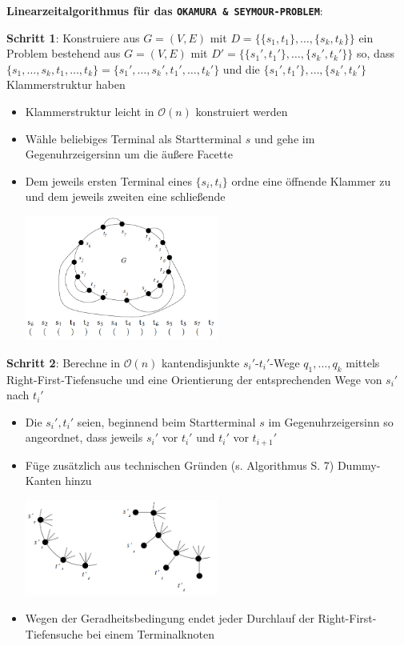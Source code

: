\textbf{Linearzeitalgorithmus für das \texttt{OKAMURA \& SEYMOUR-PROBLEM}}:

\textbf{Schritt 1}: Konstruiere aus $G=(V,E)$ mit $D=\{\{s_1,t_1\},\ldots,\{s_k,t_k\}\}$ ein Problem bestehend aus $G=(V,E)$ mit $D'=\{\{s_1',t_1'\},\ldots,\{s_k',t_k'\}\}$ so, dass $\{s_1,\ldots,s_k,t_1,\ldots,t_k\}=\{s_1',\ldots,s_k',t_1',\ldots,t_k'\}$ und die $\{s_1',t_1'\},\ldots,\{s_k',t_k'\}$ Klammerstruktur haben
\begin{itemize}
	\item Klammerstruktur leicht in $\mathcal{O}(n)$ konstruiert werden
	\item Wähle beliebiges Terminal als Startterminal $s$ und gehe  im Gegenuhrzeigersinn um die äußere Facette
	\item Dem jeweils ersten Terminal eines $\{s_i,t_i\}$ ordne eine öffnende Klammer zu und dem jeweils zweiten eine schließende
	\begin{center}
		\includegraphics[width=0.5\textwidth]{images/s3.png}
	\end{center}
\end{itemize}

\textbf{Schritt 2}: Berechne in $\mathcal{O}(n)$ kantendisjunkte $s_i'$-$t_i'$-Wege $q_1,\ldots,q_k$ mittels Right-First-Tiefensuche und eine Orientierung der entsprechenden Wege von $s_i'$ nach $t_i'$
\begin{itemize}
	\item Die $s_i',t_i'$ seien, beginnend beim Startterminal $s$ im Gegenuhrzeigersinn so angeordnet,
	dass jeweils $s_i'$ vor $t_i'$ und $t_i'$ vor $t_{i+1}'$
	\item Füge zusätzlich aus technischen Gründen (s. Algorithmus S. 7) Dummy-Kanten hinzu
	\begin{center}
		\includegraphics[width=0.5\textwidth]{images/s4.png}
	\end{center}
	\item Wegen der Geradheitsbedingung endet jeder Durchlauf der Right-First-Tiefensuche bei einem Terminalknoten
\end{itemize}


